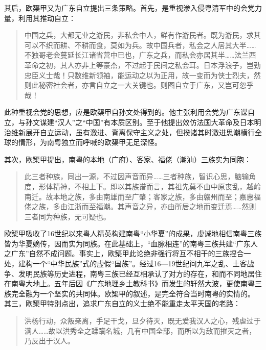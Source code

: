 其后，欧榘甲又为广东自立提出三条策略。首先，是重视渗入侵粤清军中的会党力量，利用其推动自立：


\begin{quote}

中国之兵，大都无业之游民，非私会中人，鲜有作游民者。既为游民，求其可以不织而耕、不耕而食，莫如为兵。故中国兵者，私会之人居其大半……不独哥老会蔓延长江诸省营中已也，广东之兵，而私会亦居其半……法兰西革命之初，其人亦非上等豪杰，不过起于民间之私会耳。日本浮浪子，岂劲忠臣义士哉！只数维新领袖，能运动之以为正用，故一变而为侠士烈夫，然则此秘密社会者，亦言自立之一大关键也。则图自立于广东，又岂可忽乎哉！

\end{quote}

此种重视会党的思想，应是欧榘甲自孙文处得到的。他主张利用会党为广东谋自立，与孙文谋建“汉人”之“中国”有本质区别。至于他提出效仿法国大革命及日本明治维新展开自立运动，虽有激进、背离保守主义之处，但揆诸其时激进思潮横行全球的情形，为南粤独立而呼喊的欧榘甲无足深怪。

其次，欧榘甲提出，南粤的本地（广府）、客家、福佬（潮汕）三族实为同胞：

\begin{quote}

此三者种族，同出一源，不过因声音而异……三者种族，智识心思，脑输角度，形体精神，不相上下。即以其族谱而言，其祖先莫不由中原丧乱，越岭南迁。故本地之族，多由南雄而至广肇；客家之族，多由赣州而至；嘉惠福佬之族，多由江浙而至福潮。其声音之异，亦由所居之地而变迁焉……然则三者同为种族，无可疑也。

\end{quote}

欧榘甲吸收了16世纪以来粤人精英构建南粤“小华夏”的成果，虔诚地相信南粤三族皆为华夏嫡传，因而实为同族。在此基础上，“血脉相连”的南粤三族共建“广东人之广东”自然不成问题。事实上，欧榘甲此论绝非强行将互不相干的三族捏合一处，建构一个“中华民族”式的虚假“国族”。经过16—19世纪间九军之乱、土客战争、发明民族等历史进程，南粤三族已经互相承认了对方的存在，和而不同地居住在南粤大地上。五年后因《广东地理乡土教科书》而发生的轩然大波，更使南粤三族完全融为一个坚实的共同体。欧榘甲的叙述，是完全符合当时南粤的实情的。
其三，欧榘甲特别点出，追求广东自立的义士绝不能重走太平天国的老路：

\begin{quote}

洪杨行动，众叛亲离，手足干戈，旦夕待灭，既无爱我汉人之心，残虐过于满人……故以洪秀全之蹂躏名城，几有中国全部，而所以为敌而摧灭之者，乃反出于汉人。

\end{quote}


